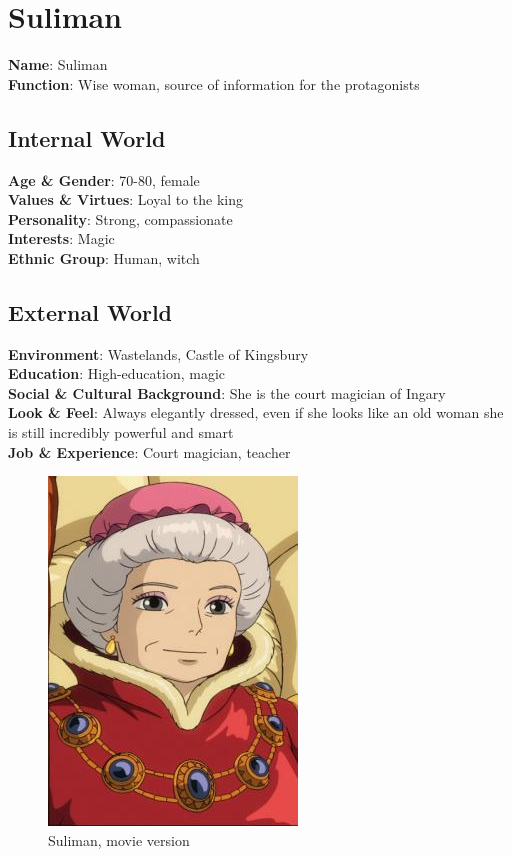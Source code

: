 \section{Suliman}

\begin{minipage}{0.5\textwidth}
\textbf{Name}: Suliman\\
\textbf{Function}: Wise woman, source of information for the protagonists

\subsection{Internal World}

\textbf{Age \& Gender}: 70-80, female \\
\textbf{Values \& Virtues}: Loyal to the king \\
\textbf{Personality}: Strong, compassionate\\
\textbf{Interests}: Magic \\
\textbf{Ethnic Group}: Human, witch

\subsection{External World}
\textbf{Environment}: Wastelands, Castle of Kingsbury \\
\textbf{Education}: High-education, magic \\
\textbf{Social \& Cultural Background}: She is the court magician of Ingary \\
\textbf{Look \& Feel}: Always elegantly dressed, even if she looks like an old woman she is still incredibly powerful and smart \\
\textbf{Job \& Experience}: Court magician, teacher \\

\end{minipage}%
%
\hfill\begin{minipage}{0.4\textwidth}
  \begin{figure}[H]
  \includegraphics{Images/Characters/suliman_portrait}
  \caption{Suliman, movie version}
\end{figure}
\end{minipage}

